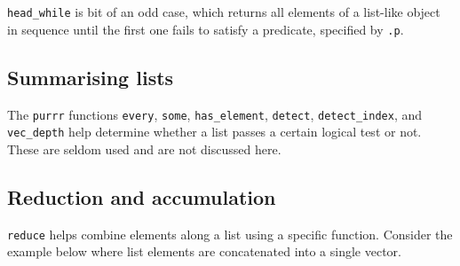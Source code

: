 \documentclass[]{book}
\newenvironment{Shaded}{}{}
\newcommand{\CommentTok}[1]{\textcolor[rgb]{0.38,0.63,0.69}{\textit{#1}}}
\newcommand{\ControlFlowTok}[1]{\textcolor[rgb]{0.00,0.44,0.13}{\textbf{#1}}}
\newcommand{\DataTypeTok}[1]{\textcolor[rgb]{0.56,0.13,0.00}{#1}}
\newcommand{\DecValTok}[1]{\textcolor[rgb]{0.25,0.63,0.44}{#1}}
\newcommand{\KeywordTok}[1]{\textcolor[rgb]{0.00,0.44,0.13}{\textbf{#1}}}
\newcommand{\NormalTok}[1]{#1}
\newcommand{\OperatorTok}[1]{\textcolor[rgb]{0.40,0.40,0.40}{#1}}
\newcommand{\StringTok}[1]{\textcolor[rgb]{0.25,0.44,0.63}{#1}}
\begin{document}
\begin{Shaded}
\end{Shaded}

\texttt{head\_while} is bit of an odd case, which returns all elements of a list-like object in sequence until the first one fails to satisfy a predicate, specified by \texttt{.p}.

\begin{Shaded}
\end{Shaded}

\hypertarget{summarising-lists}{%
\subsection{Summarising lists}\label{summarising-lists}}

The \texttt{purrr} functions \texttt{every}, \texttt{some}, \texttt{has\_element}, \texttt{detect}, \texttt{detect\_index}, and \texttt{vec\_depth} help determine whether a list passes a certain logical test or not. These are seldom used and are not discussed here.

\hypertarget{reduction-and-accumulation}{%
\subsection{Reduction and accumulation}\label{reduction-and-accumulation}}

\texttt{reduce} helps combine elements along a list using a specific function. Consider the example below where list elements are concatenated into a single vector.
\end{document}
